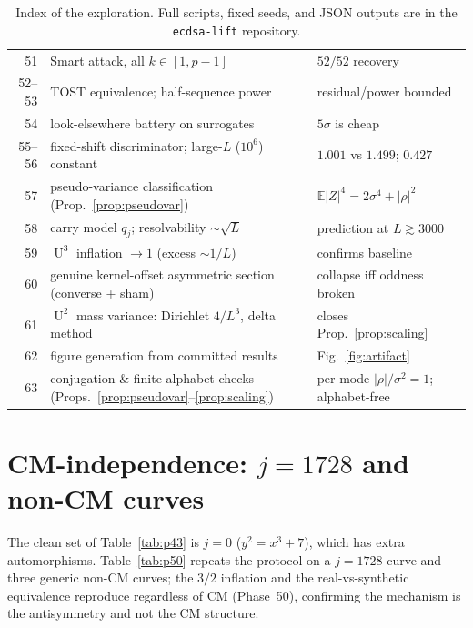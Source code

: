 \documentclass[11pt]{article}
\theoremstyle{definition}
\DeclareMathOperator{\Uk}{U}
\begin{document}
\begin{table}[H]
\begin{tabular}{rll}
51     & Smart attack, all $k\in[1,p{-}1]$ & $52/52$ recovery\\
52--53 & TOST equivalence; half-sequence power & residual/power bounded\\
54     & look-elsewhere battery on surrogates & $5\sigma$ is cheap\\
55--56 & fixed-shift discriminator; large-$L$ ($10^6$) constant & $1.001$ vs $1.499$; $0.427$\\
57     & pseudo-variance classification (Prop.~\ref{prop:pseudovar}) & $\mathbb E|Z|^4{=}2\sigma^4{+}|\rho|^2$\\
58     & carry model $q_j$; resolvability $\sim\sqrt L$ & prediction at $L\gtrsim3000$\\
59     & $\Uk^3$ inflation $\to1$ (excess $\sim1/L$) & confirms baseline\\
\midrule
60     & genuine kernel-offset asymmetric section (converse + sham) & collapse iff oddness broken\\
61     & $\Uk^2$ mass variance: Dirichlet $4/L^3$, delta method & closes Prop.~\ref{prop:scaling}\\
62     & figure generation from committed results & Fig.~\ref{fig:artifact}\\
63     & conjugation \& finite-alphabet checks (Props.~\ref{prop:pseudovar}--\ref{prop:scaling}) & per-mode $|\rho|/\sigma^2{=}1$; alphabet-free\\
\bottomrule
\end{tabular}
\caption{Index of the exploration. Full scripts, fixed seeds, and JSON
outputs are in the \texttt{ecdsa-lift} repository.}
\end{table}

\section{CM-independence: \texorpdfstring{$j{=}1728$}{j=1728} and non-CM curves}
\label{app:p50}
The clean set of Table~\ref{tab:p43} is $j{=}0$ ($y^2=x^3+7$), which has
extra automorphisms. Table~\ref{tab:p50} repeats the protocol on a
$j{=}1728$ curve and three generic non-CM curves; the $3/2$ inflation and
the real-vs-synthetic equivalence reproduce regardless of CM
(Phase~50), confirming the mechanism is the antisymmetry and not the CM
structure.
\end{document}
